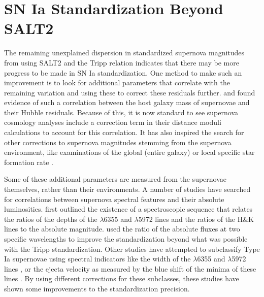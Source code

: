 \section{SN Ia Standardization Beyond SALT2}
The remaining unexplained dispersion in standardized supernova magnitudes from using SALT2 and the Tripp relation indicates that there may be more progress to be made in SN Ia standardization. One method to make such an improvement is to look for additional parameters that correlate with the remaining variation and using these to correct these residuals further. \citet{kelly_hubble_2010} and \citet{sullivan_dependence_2010} found evidence of such a correlation between the host galaxy mass of supernovae and their Hubble residuals. Because of this, it is now standard to see supernova cosmology analyses include a correction term in their distance moduli calculations to account for this correlation. It has also inspired the search for other corrections to supernova magnitudes stemming from the supernova environment, like examinations of the global (entire galaxy) or local specific star formation rate \citep{rigault_evidence_2013, rigault_confirmation_2015}.

Some of these additional parameters are measured from the supernovae themselves, rather than their environments. A number of studies have searched for correlations between supernova spectral features and their absolute luminosities. \citet{nugent_evidence_1995} first outlined the existence of a spectroscopic sequence that relates the ratios of the depths of the $\lambda$6355 and $\lambda$5972 lines and the ratios of the H\&K lines to the absolute magnitude. \citet{bailey_using_2009} used the ratio of the absolute fluxes at two specific wavelengths to improve the standardization beyond what was possible with the Tripp standardization. Other studies have attempted to subclassify Type Ia supernovae using spectral indicators like the width of the $\lambda$6355 and $\lambda$5972 lines \citep{branch_comparative_2006}, or the ejecta velocity as measured by the blue shift of the minima of these lines \citep{wang_improved_2009, foley_measuring_2011, foley_relation_2012}. By using different corrections for these subclasses, these studies have shown some improvements to the standardization precision.

